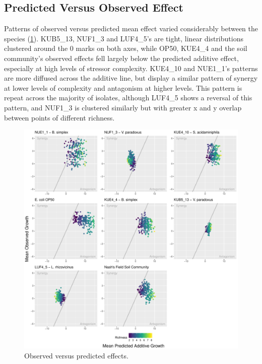 \documentclass[final,1p,times]{elsarticle}
\begin{document}
\newpage
\subsection{Predicted Versus Observed Effect}
\label{S:3:5}

Patterns of observed versus predicted mean effect varied considerably between the species (\cref{fig:obsXpred}). KUB5\_13, NUF1\_3 and LUF4\_5’s are tight, linear distributions clustered around the 0 marks on both axes, while OP50, KUE4\_4 and the soil community’s observed effects fell largely below the predicted additive effect, especially at high levels of stressor complexity. KUE4\_10 and NUE1\_1’s patterns are more diffused across the additive line, but display a similar pattern of synergy at lower levels of complexity and antagonism at higher levels. This pattern is repeat across the majority of isolates, although LUF4\_5 shows a reversal of this pattern, and NUF1\_3 is clustered similarly but with greater x and y overlap between points of different richness.

\begin{figure}[H]
    \centering
    \includegraphics[width = \textwidth]{Scripts/Results/Final_Pipeline/ObservedXPredicted.pdf}
    \caption{Observed versus predicted effects.}
    \label{fig:obsXpred}
\end{figure}
\end{document}
